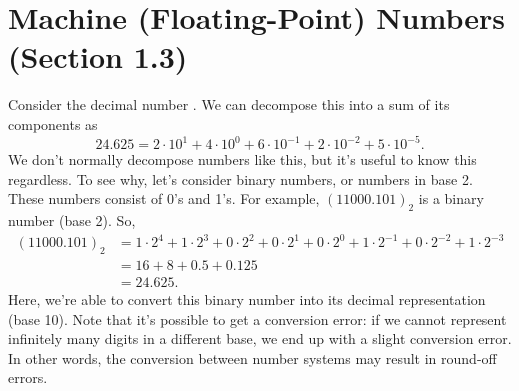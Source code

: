 \documentclass[letterpaper]{article}
\begin{document}
\section{Machine (Floating-Point) Numbers (Section 1.3)}
Consider the decimal number . We can decompose this into a sum of its components as 
\[24.625 = 2 \cdot 10^1 + 4 \cdot 10^0 + 6 \cdot 10^{-1} + 2 \cdot 10^{-2} + 5 \cdot 10^{-5}.\]
We don't normally decompose numbers like this, but it's useful to know this regardless. To see why, let's consider binary numbers, or numbers in base 2. These numbers consist of 0's and 1's. For example, $(11000.101)_2$ is a binary number (base 2). So,  
\[\begin{aligned}
    (11000.101)_2 &= 1 \cdot 2^4 + 1 \cdot 2^3 + 0 \cdot 2^2 + 0 \cdot 2^1 + 0 \cdot 2^0 + 1 \cdot 2^{-1} + 0 \cdot 2^{-2} + 1 \cdot 2^{-3} \\ 
        &= 16 + 8 + 0.5 + 0.125 \\ 
        &= 24.625.
\end{aligned}\]
Here, we're able to convert this binary number into its decimal representation (base 10). Note that it's possible to get a conversion error: if we cannot represent infinitely many digits in a different base, we end up with a slight conversion error. In other words, the conversion between number systems may result in round-off errors. 
\end{document}
